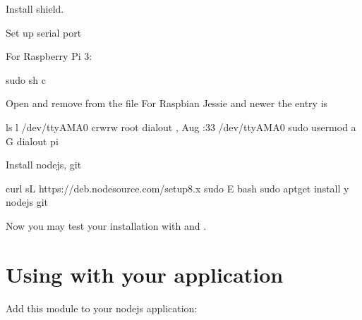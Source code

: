 \documentclass[letterpaper,10pt,english]{sphinxmanual}
\begin{document}
\sphinxstylestrong{2{]}} Install  shield.

\sphinxstylestrong{3{]}} Set up serial port

For Raspberry Pi 3:

%
\begin{sphinxVerbatim}[commandchars=\\\{\}]
sudo sh \PYGZhy{}c 
\end{sphinxVerbatim}

Open  and remove  from the file For Raspbian Jessie and newer the entry is 

%
\begin{sphinxVerbatim}[commandchars=\\\{\}]
ls \PYGZhy{}l /dev/ttyAMA0
crw\PYGZhy{}rw\PYGZhy{}\PYGZhy{}\PYGZhy{}\PYGZhy{}  root dialout ,  Aug   :33 /dev/ttyAMA0
sudo usermod \PYGZhy{}a \PYGZhy{}G dialout pi
\end{sphinxVerbatim}

\sphinxstylestrong{4{]}} Install nodejs, git

%
\begin{sphinxVerbatim}[commandchars=\\\{\}]
curl \PYGZhy{}sL https://deb.nodesource.com/setup\PYGZus{}8.x  sudo \PYGZhy{}E bash \PYGZhy{}
sudo apt\PYGZhy{}get install \PYGZhy{}y nodejs git
\end{sphinxVerbatim}

\sphinxstylestrong{5{]}}  Now you may test your installation with  and .


\section{Using with your application}
\label{\detokenize{bobaos:using-with-your-application}}\label{\detokenize{bobaos:using-with-your-application}}
Add this module to your nodejs application:
\end{document}
